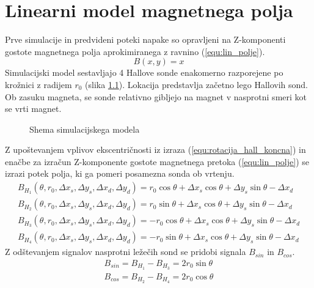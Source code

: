\chapter{Linearni model magnetnega polja}
\label{linearnimodel}
Prve simulacije in predvideni poteki napake so opravljeni na Z-komponenti gostote magnetnega polja aprokimiranega z ravnino (\ref{equ:lin_polje}).
\begin{equation}
\label{equ:lin_polje}
B(x,y)= x
\end{equation}
Simulacijski model sestavljajo 4 Hallove sonde enakomerno razporejene po krožnici z radijem $r_0$ (slika \ref{lin_simul}). Lokacija predstavlja začetno lego Hallovih sond. 
Ob zasuku magneta, se sonde relativno gibljejo na magnet v nasprotni smeri kot se vrti magnet. 
\begin{figure}[!ht]
	\centering
	\caption{Shema simulacijskega modela}
	\label{lin_simul}
\end{figure}

Z upoštevanjem vplivov ekscentričnosti iz izraza (\ref{equ:rotacija_hall_koncna}) in enačbe za izračun Z-komponente gostote magnetnega pretoka (\ref{equ:lin_polje}) se izrazi potek polja, ki ga pomeri posamezna sonda ob vrtenju.
\begin{eqnarray}
\label{equ:lin_potek_sin}
B_{H_1}(\theta, r_0, \Delta x_s, \Delta y_s, \Delta x_d, \Delta y_d)=  r_0 \cos \theta + \Delta x_s \cos \theta+ \Delta y_s \sin \theta -\Delta x_d\\
\label{equ:lin_potek_cos}
B_{H_2}(\theta, r_0, \Delta x_s, \Delta y_s, \Delta x_d, \Delta y_d)= r_0 \sin \theta + \Delta x_s \cos \theta+ \Delta y_s \sin \theta -\Delta x_d\\
B_{H_3}(\theta, r_0, \Delta x_s, \Delta y_s, \Delta x_d, \Delta y_d)=  -r_0 \cos \theta + \Delta x_s \cos \theta+ \Delta y_s \sin \theta -\Delta x_d\\
\label{equ:lin_potek_zadnja}
B_{H_4}(\theta, r_0, \Delta x_s, \Delta y_s, \Delta x_d, \Delta y_d)=-r_0 \sin \theta + \Delta x_s \cos \theta+ \Delta y_s \sin \theta -\Delta x_d
\end{eqnarray}
Z odštevanjem signalov nasprotni ležečih sond se pridobi signala  $B_{sin}$ in $B_{cos}$.
\begin{eqnarray}
B_{sin}=  B_{H_1} - B_{H_3} = 2 r_0 \sin \theta \\
B_{cos}=  B_{H_2} - B_{H_4}=  2 r_0 \cos \theta
\end{eqnarray}

